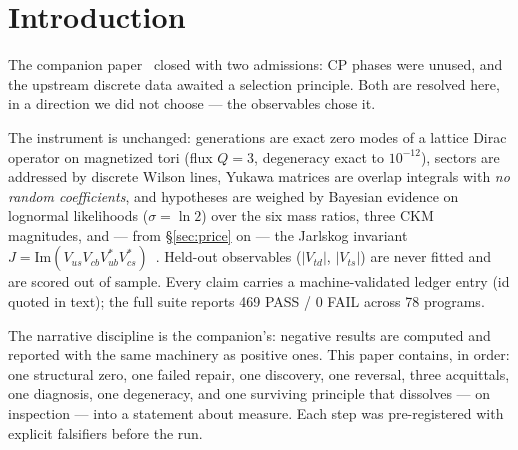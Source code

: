 \documentclass[aps,prd,preprint,nofootinbib]{revtex4-2}
\begin{document}
\begin{abstract}
valley produces the program's first surviving data-blind principle --- a
hierarchy-tilted prior at $+2.3$ nats --- whose anatomy (survival window
$\beta\in[0.25,1.7]$, collapse of hard selection at $-8386$ nats) and identity
(histogram-flattening priors reproduce it within 0.05 nats, while the
config-density slope $-0.19$ refutes the naive cancellation mechanism) reduce
it to a \emph{measure correction}: the configuration measure of the shear
family over-represents shallow mass ratios, and any data-blind correction of
this over-representation survives at $+3$ nats. The arc thus ends one level up
from where it began: the discrete-data ledger acquires complex structure, and
the measure on the ledger becomes an empirical question.
\end{abstract}

\maketitle

\section{Introduction}

The companion paper~\cite{Companion} closed with two admissions: CP phases were
unused, and the upstream discrete data awaited a selection principle. Both are
resolved here, in a direction we did not choose --- the observables chose it.

The instrument is unchanged: generations are exact zero modes of a lattice
Dirac operator on magnetized tori (flux $Q=3$, degeneracy exact to $10^{-12}$),
sectors are addressed by discrete Wilson lines, Yukawa matrices are overlap
integrals with \emph{no random coefficients}, and hypotheses are weighed by
Bayesian evidence on lognormal likelihoods ($\sigma=\ln 2$) over the six mass
ratios, three CKM magnitudes, and --- from \S\ref{sec:price} on --- the
Jarlskog invariant $J=\mathrm{Im}(V_{us}V_{cb}V^*_{ub}V^*_{cs})$~\cite{Jarlskog}.
Held-out observables ($|V_{td}|$, $|V_{ts}|$) are never fitted and are scored
out of sample. Every claim carries a machine-validated ledger entry (id quoted
in text); the full suite reports 469 PASS / 0 FAIL across 78 programs.

The narrative discipline is the companion's: negative results are computed and
reported with the same machinery as positive ones. This paper contains, in
order: one structural zero, one failed repair, one discovery, one reversal,
three acquittals, one diagnosis, one degeneracy, and one surviving principle
that dissolves --- on inspection --- into a statement about measure. Each step
was pre-registered with explicit falsifiers before the run.
\end{document}
